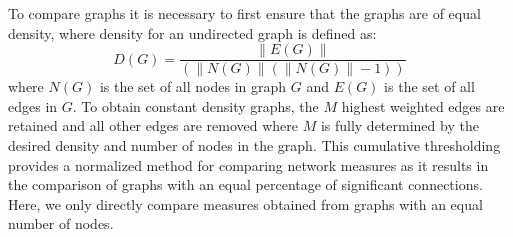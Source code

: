 \documentclass{frontiersSCNS} %
\begin{document}
To compare graphs it is necessary to first ensure that the graphs are of equal density, where density for an undirected graph is defined as:
$$D(G) = \frac{\|E(G)\|}{( \|N(G)\| (\|N(G)\|-1) )} $$
where $N(G)$ is the set of all nodes in graph $G$ and $E(G)$ is the set of all edges in $G$. To obtain constant density graphs, the $M$ highest weighted edges are retained and all other edges are removed where $M$ is fully determined by the desired density and number of nodes in the graph. This cumulative thresholding provides a normalized method for comparing network measures as it results in the comparison of graphs with an equal percentage of significant connections. Here, we only directly compare measures obtained from graphs with an equal number of nodes.


\end{document}
